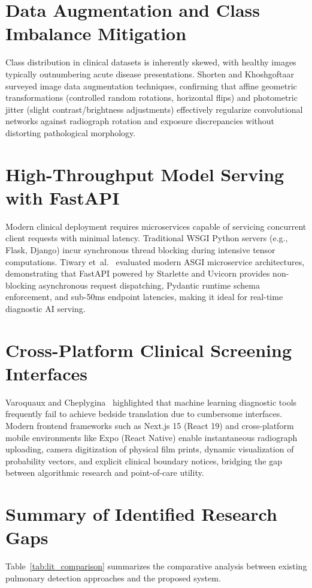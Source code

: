 \documentclass[12pt,a4paper]{report}
\begin{document}
\section{Data Augmentation and Class Imbalance Mitigation}
Class distribution in clinical datasets is inherently skewed, with healthy images typically outnumbering acute disease presentations. Shorten and Khoshgoftaar~\cite{ref_shorten2019_augmentation} surveyed image data augmentation techniques, confirming that affine geometric transformations (controlled random rotations, horizontal flips) and photometric jitter (slight contrast/brightness adjustments) effectively regularize convolutional networks against radiograph rotation and exposure discrepancies without distorting pathological morphology.

\section{High-Throughput Model Serving with FastAPI}
Modern clinical deployment requires microservices capable of servicing concurrent client requests with minimal latency. Traditional WSGI Python servers (e.g., Flask, Django) incur synchronous thread blocking during intensive tensor computations. Tiwary et~al.~\cite{ref_tiwary2022_fastapi} evaluated modern ASGI microservice architectures, demonstrating that FastAPI powered by Starlette and Uvicorn provides non-blocking asynchronous request dispatching, Pydantic runtime schema enforcement, and sub-50ms endpoint latencies, making it ideal for real-time diagnostic AI serving.

\section{Cross-Platform Clinical Screening Interfaces}
Varoquaux and Cheplygina~\cite{ref_varoquaux2022_methodology} highlighted that machine learning diagnostic tools frequently fail to achieve bedside translation due to cumbersome interfaces. Modern frontend frameworks such as Next.js 15 (React 19) and cross-platform mobile environments like Expo (React Native) enable instantaneous radiograph uploading, camera digitization of physical film prints, dynamic visualization of probability vectors, and explicit clinical boundary notices, bridging the gap between algorithmic research and point-of-care utility.

\section{Summary of Identified Research Gaps}
Table~\ref{tab:lit_comparison} summarizes the comparative analysis between existing pulmonary detection approaches and the proposed system.
\end{document}
